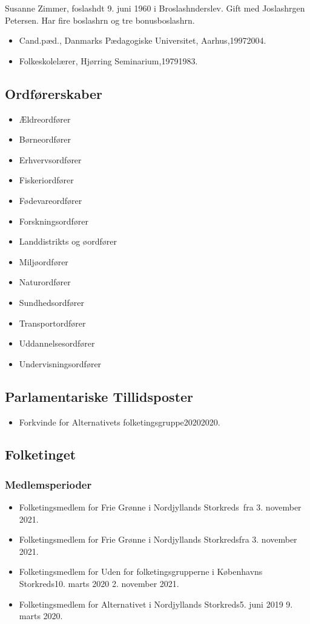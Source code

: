 \documentclass[11pt, a4paper]{awesome-cv}
\begin{document}
\makecvheader[R]
\makelettertitle
\begin{cvletter}
Susanne Zimmer, foslashdt 9. juni 1960 i Broslashnderslev. Gift med Joslashrgen Petersen. Har fire boslashrn og tre bonusboslashrn.

\begin{itemize}
\item Cand.pæd., Danmarks Pædagogiske Universitet, Aarhus,19972004.
\item Folkeskolelærer, Hjørring Seminarium,19791983.
\end{itemize}
\subsection*{Ordførerskaber}
\begin{itemize}
\item Ældreordfører
\item Børneordfører
\item Erhvervsordfører
\item Fiskeriordfører
\item Fødevareordfører
\item Forskningsordfører
\item Landdistrikts og øordfører
\item Miljøordfører
\item Naturordfører
\item Sundhedsordfører
\item Transportordfører
\item Uddannelsesordfører
\item Undervisningsordfører
\end{itemize}
\subsection*{Parlamentariske Tillidsposter}
\begin{itemize}
\item Forkvinde for Alternativets folketingsgruppe20202020.
\end{itemize}
\subsection*{Folketinget}
\subsubsection*{Medlemsperioder}
\begin{itemize}
\item Folketingsmedlem for Frie Grønne i Nordjyllands Storkreds fra 3. november 2021.
\item Folketingsmedlem for Frie Grønne i Nordjyllands Storkredsfra 3. november 2021.
\item Folketingsmedlem for Uden for folketingsgrupperne i Københavns Storkreds10. marts 2020  2. november 2021.
\item Folketingsmedlem for Alternativet i Nordjyllands Storkreds5. juni 2019  9. marts 2020.
\end{itemize}

\end{cvletter}
\end{document}
